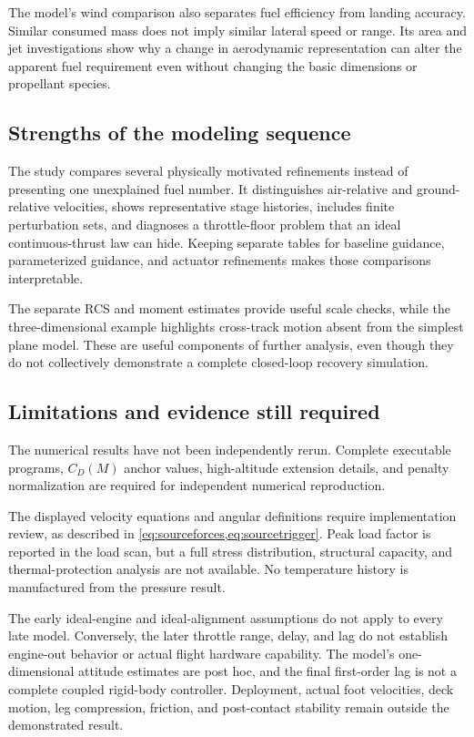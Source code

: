 \documentclass[11pt,a4paper]{article}
\begin{document}
The model's wind comparison also separates fuel efficiency from landing accuracy. Similar consumed mass does not imply similar lateral speed or range. Its area and jet investigations show why a change in aerodynamic representation can alter the apparent fuel requirement even without changing the basic dimensions or propellant species.

\subsection{Strengths of the modeling sequence}
The study compares several physically motivated refinements instead of presenting one unexplained fuel number. It distinguishes air-relative and ground-relative velocities, shows representative stage histories, includes finite perturbation sets, and diagnoses a throttle-floor problem that an ideal continuous-thrust law can hide. Keeping separate tables for baseline guidance, parameterized guidance, and actuator refinements makes those comparisons interpretable.

The separate RCS and moment estimates provide useful scale checks, while the three-dimensional example highlights cross-track motion absent from the simplest plane model. These are useful components of further analysis, even though they do not collectively demonstrate a complete closed-loop recovery simulation.

\subsection{Limitations and evidence still required}
The numerical results have not been independently rerun. Complete executable programs, $C_D(M)$ anchor values, high-altitude extension details, and penalty normalization are required for independent numerical reproduction.

The displayed velocity equations and angular definitions require implementation review, as described in \cref{eq:sourceforces,eq:sourcetrigger}. Peak load factor is reported in the load scan, but a full stress distribution, structural capacity, and thermal-protection analysis are not available. No temperature history is manufactured from the pressure result.

The early ideal-engine and ideal-alignment assumptions do not apply to every late model. Conversely, the later throttle range, delay, and lag do not establish engine-out behavior or actual flight hardware capability. The model's one-dimensional attitude estimates are post hoc, and the final first-order lag is not a complete coupled rigid-body controller. Deployment, actual foot velocities, deck motion, leg compression, friction, and post-contact stability remain outside the demonstrated result.
\end{document}
